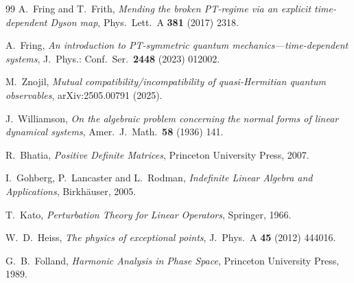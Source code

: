 \documentclass[11pt]{article}
\theoremstyle{definition}
\theoremstyle{remark}
\begin{document}
\begin{thebibliography}{99}
A.~Fring and T.~Frith,
\emph{Mending the broken PT-regime via an explicit time-dependent Dyson map},
Phys.\ Lett.\ A \textbf{381} (2017) 2318.

A.~Fring,
\emph{An introduction to PT-symmetric quantum mechanics---time-dependent
systems},
J.\ Phys.: Conf.\ Ser.\ \textbf{2448} (2023) 012002.

M.~Znojil,
\emph{Mutual compatibility/incompatibility of quasi-Hermitian quantum
observables},
arXiv:2505.00791 (2025).

J.~Williamson,
\emph{On the algebraic problem concerning the normal forms of linear
dynamical systems},
Amer.\ J.\ Math.\ \textbf{58} (1936) 141.

R.~Bhatia,
\emph{Positive Definite Matrices},
Princeton University Press, 2007.

I.~Gohberg, P.~Lancaster and L.~Rodman,
\emph{Indefinite Linear Algebra and Applications},
Birkh\"auser, 2005.

T.~Kato,
\emph{Perturbation Theory for Linear Operators},
Springer, 1966.

W.~D.~Heiss,
\emph{The physics of exceptional points},
J.\ Phys.\ A \textbf{45} (2012) 444016.

G.~B.~Folland,
\emph{Harmonic Analysis in Phase Space},
Princeton University Press, 1989.

\end{thebibliography}
\end{document}
